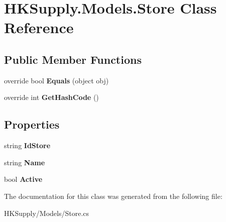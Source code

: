 \hypertarget{class_h_k_supply_1_1_models_1_1_store}{}\section{H\+K\+Supply.\+Models.\+Store Class Reference}
\label{class_h_k_supply_1_1_models_1_1_store}
\subsection*{Public Member Functions}
\begin{DoxyCompactItemize}
\item 
\mbox{\label{class_h_k_supply_1_1_models_1_1_store_a659d237751f418d4bdff083e62d02b7b}} 
override bool {\bfseries Equals} (object obj)
\item 
\mbox{\label{class_h_k_supply_1_1_models_1_1_store_aca322dd88cb540bc528524c13068aac5}} 
override int {\bfseries Get\+Hash\+Code} ()
\end{DoxyCompactItemize}
\subsection*{Properties}
\begin{DoxyCompactItemize}
\item 
\mbox{\label{class_h_k_supply_1_1_models_1_1_store_a55604d3b4e2dc50d955e344ed43bd00b}} 
string {\bfseries Id\+Store}
\item 
\mbox{\label{class_h_k_supply_1_1_models_1_1_store_ad8f20b91a35825c17ed9585c65cdaba0}} 
string {\bfseries Name}
\item 
\mbox{\label{class_h_k_supply_1_1_models_1_1_store_a2afda63e9c468c9db813fb7e8107f3b4}} 
bool {\bfseries Active}
\end{DoxyCompactItemize}


The documentation for this class was generated from the following file\+:\begin{DoxyCompactItemize}
\item 
H\+K\+Supply/\+Models/Store.\+cs\end{DoxyCompactItemize}
